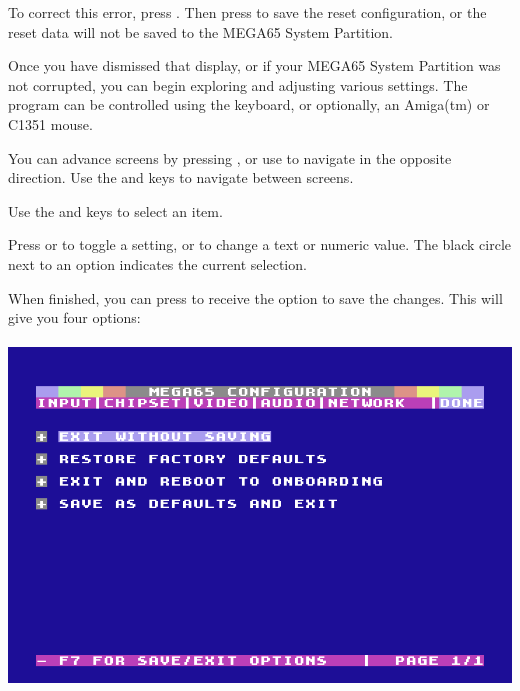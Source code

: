 To correct this error, press . Then press  to save the reset configuration, or the reset data will not be saved to the MEGA65 System
Partition.

Once you have dismissed that display, or if your MEGA65 System Partition was not corrupted, you can begin exploring and adjusting various settings. The program can be controlled using the keyboard, or optionally, an Amiga(tm) or C1351 mouse.

You can advance screens by pressing , or use  to navigate in the opposite direction. Use the \megakey{$\leftarrow$} and \megakey{$\rightarrow$} keys to navigate between screens.

Use the \megakey{$\uparrow$} and \megakey{$\downarrow$} keys to select an item.

Press  or  to toggle a setting, or to change a text or numeric value. The black circle next to an option indicates the current selection.

\begin{minipage}{\linewidth}
  When finished, you can press  to receive the
  option to save the changes. This will give you four options: \\
  \\
  \includegraphics[width=\linewidth]{images/ss-m65config-save.png}
\end{minipage}

